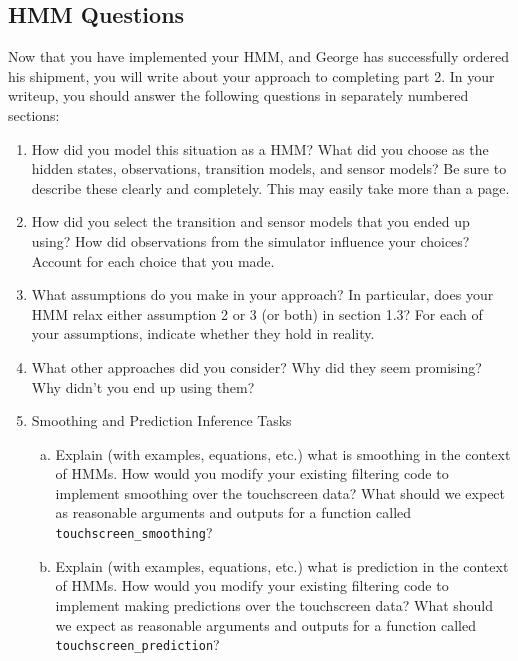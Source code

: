 \documentclass{article}
\begin{document}
\subsection{HMM Questions}
Now that you have implemented your HMM, and George has successfully ordered his shipment, you will write about your approach to completing part 2. In your writeup, you should answer the following questions in separately numbered sections:
\begin{enumerate}
\item How did you model this situation as a HMM? What did you choose as the hidden states, observations, transition models, and sensor models? Be sure to describe these clearly and completely. This may easily take more than a page.
\item How did you select the transition and sensor models that you ended up using? How did observations from the simulator influence your choices? Account for each choice that you made.
\item What assumptions do you make in your approach? In particular, does your HMM relax either assumption 2 or 3 (or both) in section 1.3? For each of your assumptions, indicate whether they hold in reality.
\item What other approaches did you consider? Why did they seem promising? Why didn’t you end up using them?
\item Smoothing and Prediction Inference Tasks
    \begin{enumerate}[(a)]
        \item Explain (with examples, equations, etc.) what is smoothing in the context of HMMs. How would you modify your existing filtering code to implement smoothing over the touchscreen data? What should we expect as reasonable arguments and outputs for a function called \texttt{touchscreen\_smoothing}?
        \item Explain (with examples, equations, etc.) what is prediction in the context of HMMs. How would you modify your existing filtering code to implement making predictions over the touchscreen data? What should we expect as reasonable arguments and outputs for a function called \texttt{touchscreen\_prediction}?
    \end{enumerate}
\end{enumerate}
\end{document}
